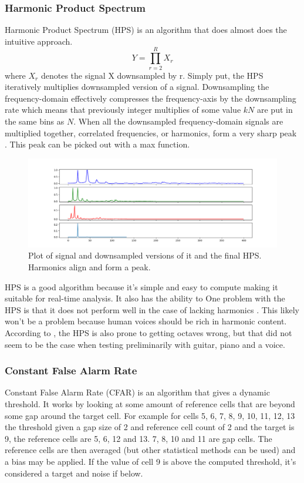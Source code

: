 \subsubsection{Harmonic Product Spectrum}
Harmonic Product Spectrum (HPS) is an algorithm that does almost does the intuitive approach. 
$$Y = \prod_{r=2}^R X_r$$ where $X_r$ denotes the signal X downsampled by r. Simply put, the HPS iteratively multiplies downsampled version of a signal. Downsampling the frequency-domain effectively compresses the frequency-axis by the downsampling rate which means that previously integer multiplies of some value $kN$ are put in the same bins as $N$. When all the downsampled frequency-domain signals are multiplied together, correlated frequencies, or harmonics, form a very sharp peak \cite{McLeod2008}. This peak can be picked out with a max function.

\begin{figure}[ht]
    \centering
    \includegraphics[width=\textwidth]{./images/hps.png}
    \caption{Plot of signal and downsampled versions of it and the final HPS. Harmonics align and form a peak. \label{fig:hps}}
\end{figure}

HPS is a good algorithm because it's simple and easy to compute making it suitable for real-time analysis. It also has the ability to 
One problem with the HPS is that it does not perform well in the case of lacking harmonics \cite{McLeod2008}. This likely won't be a problem because human voices should be rich in harmonic content. According to \cite{Smyth2019}, the HPS is also prone to getting octaves wrong, but that did not seem to be the case when testing preliminarily with guitar, piano and a voice.

\subsubsection{Constant False Alarm Rate}

Constant False Alarm Rate (CFAR) is an algorithm that gives a dynamic threshold. It works by looking at some amount of reference cells that are beyond some gap around the target cell. For example for cells 5, 6, 7, 8, 9, 10, 11, 12, 13 the threshold given a gap size of 2 and reference cell count of 2 and the target is 9, the reference cells are 5, 6, 12 and 13. 7, 8, 10 and 11 are gap cells. The reference cells are then averaged (but other statistical methods can be used) and a bias may be applied. If the value of cell 9 is above the computed threshold, it's considered a target and noise if below.

